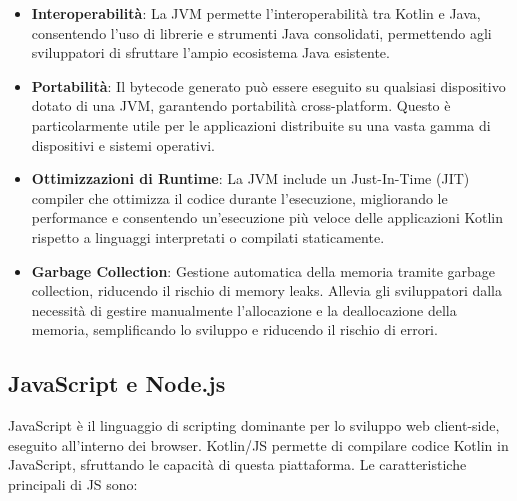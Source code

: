 \documentclass[12pt,a4paper,openright,twoside]{book}
\begin{document}
\begin{itemize}
\item \textbf{Interoperabilità}: La \ac{JVM} permette l'interoperabilità tra Kotlin e Java, consentendo l'uso di librerie e strumenti Java consolidati, 
 permettendo agli sviluppatori di sfruttare l'ampio ecosistema Java esistente.
\item \textbf{Portabilità}: Il bytecode generato può essere eseguito su qualsiasi dispositivo dotato di una \ac{JVM}, garantendo portabilità cross-platform. 
Questo è particolarmente utile per le applicazioni distribuite su una vasta gamma di dispositivi e sistemi operativi.
\item \textbf{Ottimizzazioni di Runtime}: La \ac{JVM} include un Just-In-Time (JIT) compiler che ottimizza il codice durante l'esecuzione, migliorando le performance e 
consentendo un'esecuzione più veloce delle applicazioni Kotlin rispetto a linguaggi interpretati o compilati staticamente.
\item \textbf{Garbage Collection}: Gestione automatica della memoria tramite garbage collection, riducendo il rischio di memory leaks. 
Allevia gli sviluppatori dalla necessità di gestire manualmente l'allocazione e la deallocazione della memoria, semplificando lo sviluppo e riducendo il rischio di errori.
\end{itemize}

\subsection{JavaScript e Node.js}

JavaScript è il linguaggio di scripting dominante per lo sviluppo web client-side, eseguito all'interno dei browser. Kotlin/\ac{JS} permette di compilare codice Kotlin in JavaScript, 
sfruttando le capacità di questa piattaforma. Le caratteristiche principali di \ac{JS} sono:
\end{document}
